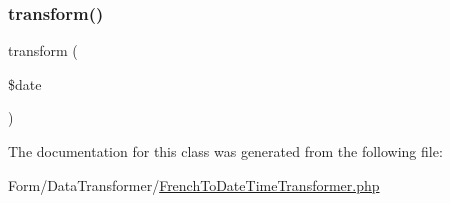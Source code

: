 \mbox{\label{class_app_1_1_form_1_1_data_transformer_1_1_french_to_date_time_transformer_a9282ce0f8c34e8f40806bac8a2b119ed}} 
\subsubsection{\texorpdfstring{transform()}{transform()}}
{\footnotesize\ttfamily transform (\begin{DoxyParamCaption}\item[{}]{\$date }\end{DoxyParamCaption})}



The documentation for this class was generated from the following file\+:\begin{DoxyCompactItemize}
\item 
Form/\+Data\+Transformer/\mbox{\hyperlink{_french_to_date_time_transformer_8php}{French\+To\+Date\+Time\+Transformer.\+php}}\end{DoxyCompactItemize}
